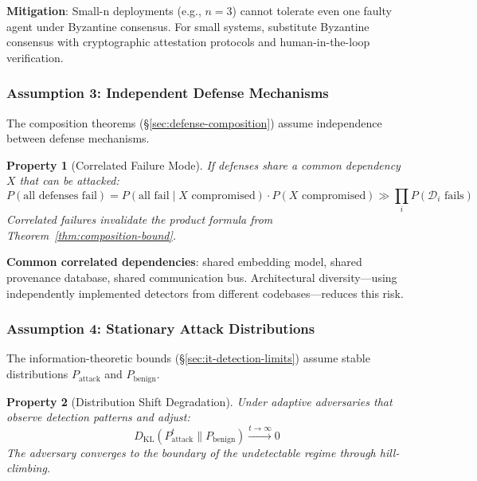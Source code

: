 \documentclass[
]{article}
\newtheorem{property}{Property}[section]
\begin{document}
\textbf{Mitigation}: Small-n deployments (e.g., \(n=3\)) cannot tolerate
even one faulty agent under Byzantine consensus. For small systems,
substitute Byzantine consensus with cryptographic attestation protocols
and human-in-the-loop verification.

\subsubsection{Assumption 3: Independent Defense
Mechanisms}\label{assumption-3-independent-defense-mechanisms}

The composition theorems (§\ref{sec:defense-composition}) assume
independence between defense mechanisms.

\begin{property}[Correlated Failure Mode]
\label{prop:correlated-failure}
If defenses share a common dependency $X$ that can be attacked:
\begin{equation}
\label{eq:correlated-failure}
P(\text{all defenses fail}) = P(\text{all fail} \mid X \text{ compromised}) \cdot P(X \text{ compromised}) \gg \prod_i P(\mathcal{D}_i \text{ fails})
\end{equation}
Correlated failures invalidate the product formula from Theorem~\ref{thm:composition-bound}.
\end{property}

\textbf{Common correlated dependencies}: shared embedding model, shared
provenance database, shared communication bus. Architectural
diversity---using independently implemented detectors from different
codebases---reduces this risk.

\subsubsection{Assumption 4: Stationary Attack
Distributions}\label{assumption-4-stationary-attack-distributions}

The information-theoretic bounds (§\ref{sec:it-detection-limits}) assume
stable distributions \(P_{\text{attack}}\) and \(P_{\text{benign}}\).

\begin{property}[Distribution Shift Degradation]
\label{prop:dist-shift}
Under adaptive adversaries that observe detection patterns and adjust:
\begin{equation}
\label{eq:dist-shift}
D_{\mathrm{KL}}(P_{\text{attack}}^t \| P_{\text{benign}}) \xrightarrow{t \to \infty} 0
\end{equation}
The adversary converges to the boundary of the undetectable regime through hill-climbing.
\end{property}
\end{document}
